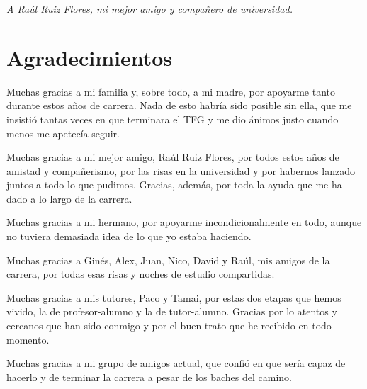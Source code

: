 
\thispagestyle{empty}
\vspace*{\fill}
\begin{flushright}
  \textit{A Raúl Ruiz Flores, mi mejor amigo y compañero de universidad.}
\end{flushright}
\vspace*{\fill}
\cleardoublepage

\chapter*{Agradecimientos}

Muchas gracias a mi familia y, sobre todo, a mi madre, por apoyarme tanto durante estos años de carrera. Nada de esto habría sido posible sin ella, que me insistió tantas veces en que terminara el TFG y me dio ánimos justo cuando menos me apetecía seguir.

Muchas gracias a mi mejor amigo, Raúl Ruiz Flores, por todos estos años de amistad y compañerismo, por las risas en la universidad y por habernos lanzado juntos a todo lo que pudimos. Gracias, además, por toda la ayuda que me ha dado a lo largo de la carrera.

Muchas gracias a mi hermano, por apoyarme incondicionalmente en todo, aunque no tuviera demasiada idea de lo que yo estaba haciendo.

Muchas gracias a Ginés, Alex, Juan, Nico, David y Raúl, mis amigos de la carrera, por todas esas risas y noches de estudio compartidas.

Muchas gracias a mis tutores, Paco y Tamai, por estas dos etapas que hemos vivido, la de profesor-alumno y la de tutor-alumno. Gracias por lo atentos y cercanos que han sido conmigo y por el buen trato que he recibido en todo momento.

Muchas gracias a mi grupo de amigos actual, que confió en que sería capaz de hacerlo y de terminar la carrera a pesar de los baches del camino.

